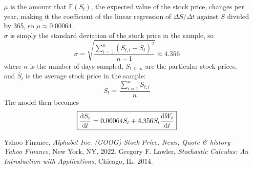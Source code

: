 \documentclass[12pt, A4]{report}
\newcommand{\Exp}{\mathbb{E}}
\begin{document}
	\(\mu\) is the amount that \(\Exp(S_t)\), the expected value of the stock price, changes per year, making it the coefficient of the linear regression of \(\Delta S/\Delta t\) against \(S\) divided by 365, so \(\mu \approx 0.00064\).\\
	\(\sigma\) is simply the standard deviation of the stock price in the sample, so 
		\[\sigma = \sqrt{\frac{\sum\limits_{i = 1}^n(S_{t, i} - \bar{S}_{t})^2}{n - 1}} \approx 4.356\]
		where \(n\) is the number of days sampled, \(S_{t, 1 \cdots n}\) are the particular stock prices, and \(\bar{S}_t\) is the average stock price in the sample:
		\[\bar{S}_t = \frac{\sum\limits_{i = 1}^nS_{t,i}}{n}\]
	The model then becomes
		\[\boxed{\dv{S_t}{t} = 0.00064S_t + 4.356S_t\dv{W_t}{t}}\]
	\begin{thebibliography}{1}
			Yahoo Finance,
			\textit{Alphabet Inc. (GOOG) Stock Price, News, Quote \& history - Yahoo Finance},
			New York, NY,
			2022.
			Gregory F. Lawler,
			\textit{Stochastic Calculus: An Introduction with Applications},
			Chicago, IL, 
			2014.
	\end{thebibliography}
\end{document}
